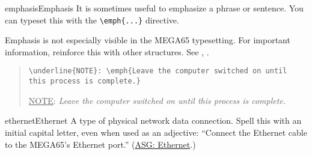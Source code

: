 \begin{sgentry}{emphasis}{Emphasis}
    It is sometimes useful to emphasize a phrase or sentence. You can typeset this with the \texttt{{\textbackslash}emph\{...\}} directive.

    Emphasis is not especially visible in the MEGA65 typesetting. For important information, reinforce this with other structures. See , .

    \begin{quote}
        \texttt{{\textbackslash}underline\{NOTE\}: {\textbackslash}emph\{Leave the computer switched on until this process is complete.\}}

        \hrulefill

        \underline{NOTE}: \emph{Leave the computer switched on until this process is complete.}
    \end{quote}
\end{sgentry}

\begin{sgentry}{ethernet}{Ethernet}
    A type of physical network data connection. Spell this with an initial capital letter, even when used as an adjective: ``Connect the Ethernet cable to the MEGA65's Ethernet port.'' (\href{https://support.apple.com/en-my/guide/applestyleguide/apsg076a7313/web}{ASG: Ethernet}.)
\end{sgentry}

